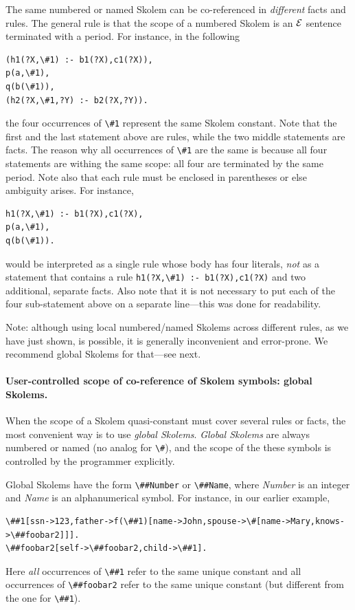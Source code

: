 \documentclass[11pt]{article}
\newcommand{\ERGO}{\mbox{\ensuremath{\cal{E}}\smaller{{\sc{RGO}}}}\xspace}
\newcommand{\FLSYSTEM}{\ERGO}
\newcommand{\bs}{\textbackslash}
\begin{document}
The same numbered or named
Skolem can be co-referenced in \emph{different} facts and
rules.  The general rule is that the scope of a numbered Skolem is an \FLSYSTEM
sentence terminated with a period. For instance, in the following
\begin{verbatim}
(h1(?X,\#1) :- b1(?X),c1(?X)),
p(a,\#1),
q(b(\#1)),
(h2(?X,\#1,?Y) :- b2(?X,?Y)).
\end{verbatim}
the four occurrences of \texttt{\bs{}\#1} represent the same Skolem constant.
Note that the first and the last statement above are rules, while the two
middle statements are facts. The reason why all occurrences of
\texttt{\bs{}\#1} are the same is because all
four statements are withing the same scope: all four are terminated by the
same period. Note also that each rule must be enclosed in parentheses or
else ambiguity arises. For instance,
\begin{verbatim}
h1(?X,\#1) :- b1(?X),c1(?X),
p(a,\#1),
q(b(\#1)).
\end{verbatim}
would be interpreted as a single rule whose body has four literals,
\emph{not} as a statement that contains a rule
\verb|h1(?X,\#1) :- b1(?X),c1(?X)|
and two additional, separate facts.
Also note that it is not necessary to put each of the four sub-statement above 
on a separate line---this was done for readability.

Note: although using local numbered/named Skolems across different rules,
as we have just shown, is possible, it is generally inconvenient and
error-prone. We recommend global Skolems for that---see next.

\paragraph{User-controlled scope of co-reference of Skolem symbols: global
  Skolems.}
When the scope of a Skolem quasi-constant must cover several rules or facts,
the most convenient way is to use \emph{global Skolems}.   
\emph{Global Skolems} are  always numbered or named (no analog for \verb|\#|),
and the scope of
the these symbols is controlled by the programmer explicitly.

\index{\bs{}\#\# - global Skolem}
Global Skolems have the form \texttt{\bs{}\#\#Number} or
\texttt{\bs{}\#\#Name}, where \emph{Number} is an integer and \emph{Name} is
an alphanumerical symbol.  
For instance, in our earlier example,
\begin{verbatim}
\##1[ssn->123,father->f(\##1)[name->John,spouse->\#[name->Mary,knows->\##foobar2]]].
\##foobar2[self->\##foobar2,child->\##1].
\end{verbatim}
Here
\emph{all} occurrences of \texttt{\bs{}\#\#1} refer to the same unique constant
and all occurrences of \texttt{\bs{}\#\#foobar2}
refer to the same unique constant (but different from the one for
\texttt{\bs{}\#\#1}).
\end{document}

